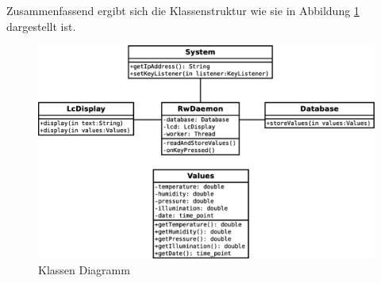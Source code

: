 \documentclass[
    10pt,
    a4paper,
]{scrartcl}
\begin{document}
Zusammenfassend ergibt sich die Klassenstruktur wie sie in Abbildung
\ref{fig:class-diagram} dargestellt ist.

\begin{figure}[ht]
    \centering
    \includegraphics[width=\textwidth]{class-diagram.eps}
    \caption{Klassen Diagramm}
    \label{fig:class-diagram}
\end{figure}


\listoffigures




\end{document}
